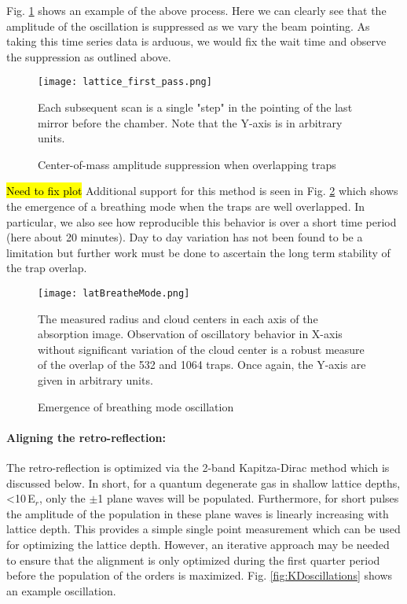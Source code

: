 Fig. \ref{fig:latFirtPass} shows an example of the above process.
Here we can clearly see that the amplitude of the oscillation is suppressed as we vary the beam pointing.
As taking this time series data is arduous, we would fix the wait time and observe the suppression as outlined above.
	\begin{figure} 
		\centerline{
		\texttt{[image: lattice\_first\_pass.png]}}
		\caption{Center-of-mass amplitude suppression when overlapping traps}{Each subsequent scan is a single "step" in the pointing of the last mirror before the chamber. Note that the Y-axis is in arbitrary units.}
		\label{fig:latFirtPass}
	\end{figure}
	
\hl{Need to fix plot} Additional support for this method is seen in Fig. \ref{fig:latBreatheMode} which shows the emergence of a breathing mode when the traps are well overlapped.
In particular, we also see how reproducible this behavior is over a short time period (here about 20 minutes).
Day to day variation has not been found to be a limitation but further work must be done to ascertain the long term stability of the trap overlap.
	\begin{figure} 
		\centerline{
		\texttt{[image: latBreatheMode.png]}}
		\caption{Emergence of breathing mode oscillation}{The measured radius and cloud centers in each axis of the absorption image. Observation of oscillatory behavior in X-axis without significant variation of the cloud center is a robust measure of the overlap of the 532 and 1064 traps. Once again, the Y-axis are given in arbitrary units.}
		\label{fig:latBreatheMode}
	\end{figure}

\paragraph{Aligning the retro-reflection:}
The retro-reflection is optimized via the 2-band Kapitza-Dirac method which is discussed below.
In short, for a quantum degenerate gas in shallow lattice depths, <10\,E$_r$, only the $\pm$1 plane waves will be populated.
Furthermore, for short pulses the amplitude of the population in these plane waves is linearly increasing with lattice depth.
This provides a simple single point measurement which can be used for optimizing the lattice depth.
However, an iterative approach may be needed to ensure that the alignment is only optimized during the first quarter period before the population of the orders is maximized.
Fig. \ref{fig:KDoscillations} shows an example oscillation.

